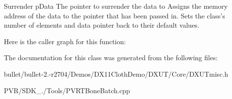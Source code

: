   Surrender  p\+Data The pointer to surrender the data to  Assigns the memory address of the data to the pointer that has been passed in. Sets the class's number of elements and data pointer back to their default values. 

Here is the caller graph for this function\+:




The documentation for this class was generated from the following files\+:\begin{DoxyCompactItemize}
\item 
bullet/bullet-\/2.-\/r2704/\+Demos/\+D\+X11\+Cloth\+Demo/\+D\+X\+U\+T/\+Core/D\+X\+U\+Tmisc.\+h\item 
P\+V\+R/\+S\+D\+K\+\_./\+Tools/P\+V\+R\+T\+Bone\+Batch.\+cpp\end{DoxyCompactItemize}
